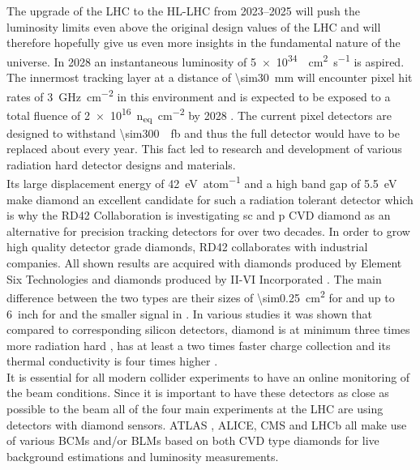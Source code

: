 The upgrade of the \ac{LHC} to the \ac{HL-LHC} from \SIrange{2023}{2025}{} \cite{hllhc} will push the luminosity limits even above the original design values of the \ac{LHC} and will therefore hopefully give us even more insights in the fundamental nature of the universe. In 2028 an instantaneous luminosity of \SI{5e34}{\per\centi\meter\squared\per\second} is aspired. The innermost tracking layer at a distance of \SI{\sim30}{\milli\meter} will encounter pixel hit rates of \SI{3}{\giga\hertz\per\centi\meter^2} in this environment and is expected to be exposed to a total fluence of \SI{2e16}{n_{eq}\per \centi\meter^2} by 2028 \cite{auzinger}. The current pixel detectors are designed to withstand \SI{\sim300}{\per\femto\barn} and thus the full detector would have to be replaced about every year. This fact led to research and development of various radiation hard detector designs and materials.\\
Its large displacement energy of \SI{42}{\electronvolt\per atom} and a high band gap of \SI{5.5}{\electronvolt} make diamond an excellent candidate for such a radiation tolerant detector which is why the RD42 Collaboration is investigating \ac{sc} and \ac{p} \ac{CVD} diamond as an alternative for precision tracking detectors for over two decades. In order to grow high quality detector grade diamonds, RD42 collaborates with industrial companies. All shown results are acquired with \sccvd diamonds produced by Element Six Technologies \cite{e6} and \pcvd diamonds produced by II-VI Incorporated \cite{II6}. The main difference between the two types are their sizes of \SI{\sim0.25}{\centi\meter\squared} for \sccvd and up to \SI{6}{inch} for \pcvd and the  smaller signal in \pcvd \cite{felix}.
In various studies it was shown that compared to corresponding silicon detectors, diamond is at minimum three times more radiation hard \cite{deboer}, has at least a two times faster charge collection \cite{pernegger} and its thermal conductivity is four times higher \cite{zhao}.\\
It is essential for all modern collider experiments to have an online monitoring of the beam conditions. Since it is important to have these detectors as close as possible to the beam all of the four main experiments at the \ac{LHC} are using detectors with diamond sensors. ATLAS \cite{gorisek}, ALICE, CMS \cite{bartz} and LHCb \cite{domke} all make use of various \acp{BCM} and/or \acp{BLM} based on both \ac{CVD} type diamonds for live background estimations and luminosity measurements.\\
